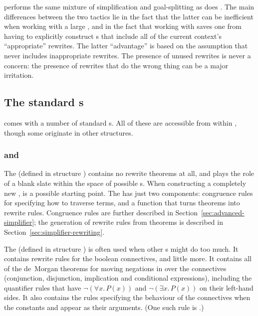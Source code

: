  performs the same mixture of simplification and
goal-splitting as does .  The main differences between the
two tactics lie in the fact that the latter can be inefficient when
working with a large , and in the fact that working with
 saves one from having to explicitly construct
\simpset{}s that include all of the current context's ``appropriate''
rewrites.  The latter ``advantage'' is based on the assumption that
 never includes inappropriate rewrites.  The presence
of unused rewrites is never a concern: the presence of rewrites that
do the wrong thing can be a major irritation.

\subsection{The standard \simpset{}s}
\label{sec:standard-simpsets}

\HOL{} comes with a number of standard \simpset{}s.  All of these are
accessible from within , though some originate in other
structures.

\subsubsection{ and }
\label{sec:purebool-ss}
%
%
The  \simpset{} (defined in structure )
contains no rewrite theorems at all, and plays the role of a blank
slate within the space of possible \simpset{}s.  When constructing a
completely new \simpset,  is a possible starting point.
The  \simpset{} has just two components: congruence rules
for specifying how to traverse terms, and a function that turns
theorems into rewrite rules.  Congruence rules are further described
in Section~\ref{sec:advanced-simplifier}; the generation of rewrite
rules from theorems is described in
Section~\ref{sec:simplifier-rewriting}.

%
The  \simpset{} (defined in structure ) is
often used when other \simpset{}s might do too much.  It contains
rewrite rules for the boolean connectives, and little more.  It
contains all of the de~Morgan theorems for moving negations in over
the connectives (conjunction, disjunction, implication and conditional
expressions), including the quantifier rules that have $\neg(\forall
x.\,P(x))$ and $\neg(\exists x.\,P (x))$ on their left-hand sides.  It
also contains the rules specifying the behaviour of the connectives
when the constants  and  appear as their
arguments.  (One such rule is .)

